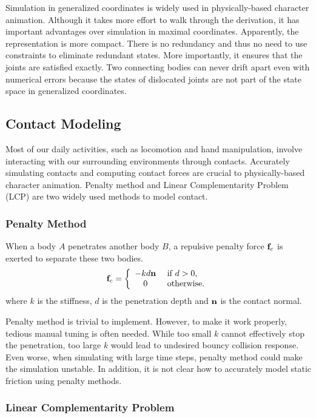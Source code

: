 Simulation in generalized coordinates is widely used in physically-based character animation. Although it takes more effort to walk through the derivation, it has important advantages over simulation in maximal coordinates. Apparently, the representation is more compact. There is no redundancy and thus no need to use constraints to eliminate redundant states. More importantly, it ensures that the joints are satisfied exactly. Two connecting bodies can never drift apart even with numerical errors because the states of dislocated joints are not part of the state space in generalized coordinates.

\subsection{Contact Modeling}
Most of our daily activities, such as locomotion and hand manipulation, involve interacting with our surrounding environments through contacts. Accurately simulating contacts and computing contact forces are crucial to physically-based character animation. Penalty method and Linear Complementarity Problem (LCP) are two widely used methods to model contact.

\subsubsection{Penalty Method}
When a body $A$ penetrates another body $B$, a repulsive penalty force $\mathbf{f}_c$ is exerted to separate these two bodies.
\begin{equation}
\mathbf{f}_c=
\left\{
\begin{array}{cl}
-kd\mathbf{n} & \textrm{        if } d > 0,\\
0 & \textrm{        otherwise.}
\end{array}
\right.
\end{equation}
where $k$ is the stiffness, $d$ is the penetration depth and $\mathbf{n}$ is the contact normal. 

Penalty method is trivial to implement. However, to make it work properly, tedious manual tuning is often needed. While too small $k$ cannot effectively stop the penetration, too large $k$ would lead to undesired bouncy collision response. Even worse, when simulating with large time steps, penalty method could make the simulation unstable. In addition, it is not clear how to accurately model static friction using penalty methods.

\subsubsection{Linear Complementarity Problem}


